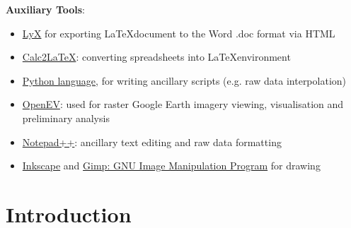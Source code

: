 \documentclass[11pt]{article}
\begin{document}
	\vspace{1ex}
	\textbf{Auxiliary Tools}:
	\begin{itemize}
		\item \href{http://www.lyx.org/}{LyX} for exporting \LaTeX document to the Word .doc format via HTML
		\item \href{http://calc2latex.sourceforge.net/}{Calc2LaTeX}: converting spreadsheets into \LaTeX environment
		\item \href{http://www.python.org/}{Python language}, for writing ancillary scripts (e.g. raw data interpolation)
		\item \href{http://openev.sourceforge.net/}{OpenEV}: used for raster Google Earth imagery viewing, visualisation and preliminary analysis
		\item \href{http://www.notepad-plus-plus.org/}{Notepad++}: ancillary text editing and raw data formatting
		\item \href{http://inkscape.org/}{Inkscape} and \href{http://www.gimp.org/}{Gimp: GNU Image Manipulation Program} for drawing
	\end{itemize}
	
\pagebreak

\section*{}
\setcounter{lofdepth}{2}
\onehalfspacing
\listoffigures
\pagebreak

\section*{}
\listoftables
\pagebreak

\section{Introduction}\label{sec:1}

\end{document}
